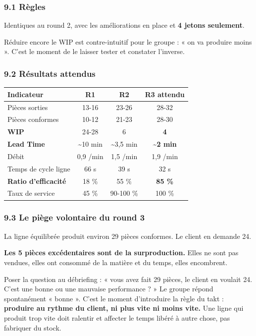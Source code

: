 \documentclass[
]{article}
\newcounter{none} %
\begin{document}
\subsubsection{9.1 Règles}\label{ruxe8gles-1}

Identiques au round 2, avec les améliorations en place et \textbf{4
jetons seulement}.

Réduire encore le WIP est contre-intuitif pour le groupe : « on va
produire moins ». C'est le moment de le laisser tester et constater
l'inverse.

\subsubsection{9.2 Résultats attendus}\label{ruxe9sultats-attendus-2}

{\def\LTcaptype{none} %
\begin{longtable}[]{@{}lccc@{}}
\toprule\noalign{}
Indicateur & R1 & R2 & R3 attendu \\
\midrule\noalign{}
\endhead
\bottomrule\noalign{}
\endlastfoot
Pièces sorties & 13-16 & 23-26 & 28-32 \\
Pièces conformes & 10-12 & 21-23 & 28-30 \\
\textbf{WIP} & 24-28 & 6 & \textbf{4} \\
\textbf{Lead Time} & \textasciitilde10 min & \textasciitilde3,5 min &
\textbf{\textasciitilde2 min} \\
Débit & 0,9 /min & 1,5 /min & 1,9 /min \\
Temps de cycle ligne & 66 s & 39 s & 32 s \\
\textbf{Ratio d'efficacité} & 18 \% & 55 \% & \textbf{85 \%} \\
Taux de service & 45 \% & 90-100 \% & 100 \% \\
\end{longtable}
}

\subsubsection{9.3 Le piège volontaire du round
3}\label{le-piuxe8ge-volontaire-du-round-3}

La ligne équilibrée produit environ 29 pièces conformes. Le client en
demande 24.

\textbf{Les 5 pièces excédentaires sont de la surproduction.} Elles ne
sont pas vendues, elles ont consommé de la matière et du temps, elles
encombrent.

Poser la question au débriefing : « vous avez fait 29 pièces, le client
en voulait 24. C'est une bonne ou une mauvaise performance ? » Le groupe
répond spontanément « bonne ». C'est le moment d'introduire la règle du
takt : \textbf{produire au rythme du client, ni plus vite ni moins
vite.} Une ligne qui produit trop vite doit ralentir et affecter le
temps libéré à autre chose, pas fabriquer du stock.
\end{document}
